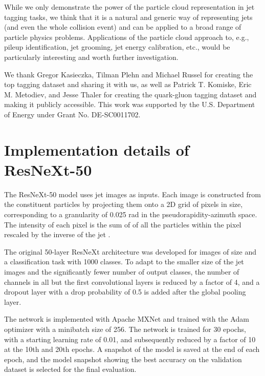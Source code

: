 \documentclass[aps,prd,longbibliography,reprint,amsmath,amssymb,amsfonts]{revtex4-1}
\begin{document}
While we only demonstrate the power of the particle cloud representation in jet tagging tasks, we think that it is a natural and generic way of representing jets (and even the whole collision event) and can be applied to a broad range of particle physics problems. Applications of the particle cloud approach to, e.g., pileup identification, jet grooming, jet energy calibration, etc., would be particularly interesting and worth further investigation.
 
\begin{acknowledgments}
We thank Gregor Kasieczka, Tilman Plehn and Michael Russel for creating the top tagging dataset and sharing it with us, as well as Patrick T. Komiske, Eric M. Metodiev, and Jesse Thaler for creating the quark-gluon tagging dataset and making it publicly accessible. 
This work was supported by the U.S. Department of Energy under Grant No. DE-SC0011702. 
\end{acknowledgments}





\appendix

\section{Implementation details of ResNeXt-50}
\label{app:arch-resnext50}

The ResNeXt-50 model uses jet images as inputs. Each image is constructed from the constituent particles by projecting them onto a 2D grid of  pixels in size, corresponding to a granularity of 0.025 rad in the pseudorapidity-azimuth space. The intensity of each pixel is the sum of  of all the particles within the pixel rescaled by the inverse of the jet . 

The original 50-layer ResNeXt architecture \cite{xie2017aggregated} was developed for images of size  and a classification task with 1000 classes. To adapt to the smaller size of the jet images and the significantly fewer number of output classes, the number of channels in all but the first convolutional layers is reduced by a factor of 4, and a dropout layer with a drop probability of 0.5 is added after the global pooling layer. 

The network is implemented with Apache MXNet and trained with the Adam optimizer with a minibatch size of 256. The network is trained for 30 epochs, with a starting learning rate of 0.01, and subsequently reduced by a factor of 10 at the 10th and 20th epochs. A snapshot of the model is saved at the end of each epoch, and the model snapshot showing the best accuracy on the validation dataset is selected for the final evaluation. 
\end{document}
